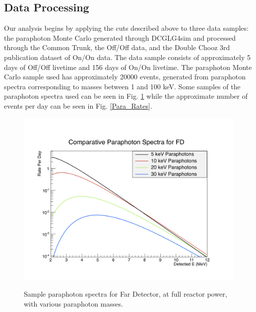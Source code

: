 \subsection{Data Processing}
\label{sec:Data Processing}

Our analysis begins by applying the cuts described above to three data samples: the paraphoton Monte Carlo generated through DCGLG4sim and processed through the Common Trunk, the Off/Off data, and the Double Chooz 3rd publication dataset of On/On data. The data sample consists of approximately 5 days of Off/Off livetime and 156 days of On/On livetime. The paraphoton Monte Carlo sample used has approximately 20000 events, generated from paraphoton spectra corresponding to masses between 1 and 100 keV. Some samples of the paraphoton spectra used can be seen in  Fig. \ref{Para_Spec} while the approximate number of events per day can be seen in Fig. \ref{Para_Rates}.

\begin{figure}
\caption{Sample paraphoton spectra for Far Detector, at full reactor power, with various paraphoton masses.}
\includegraphics[width=\textwidth]{Paraphotons/Far_Theory_Spectrum.jpg}
\label{Para_Spec}
\end{figure}

